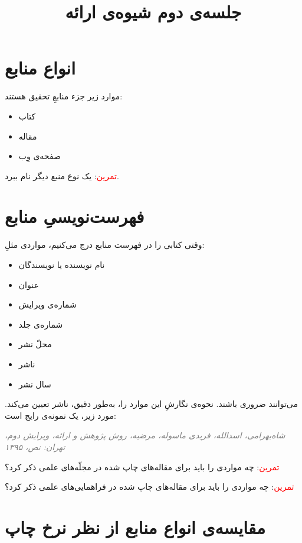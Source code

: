 \documentclass{article}
\begin{document}
\title{جلسه‌ی دوم شیوه‌ی ارائه}
\date{}
\maketitle
\section{انواع منابع}
موارد زیر جزء منابعِ تحقیق هستند:
\begin{itemize}
\item کتاب
\item مقاله
\item صفحه‌ی وِب
\end{itemize}
\textcolor{red}{تمرین}: یک نوع منبع دیگر نام ببرد.
\section{فهرست‌نویسیِ منابع} \label{sec:refs}
وقتی کتابی را در فهرست منابع درج می‌کنیم، مواردی مثلِ:
\begin{itemize}
\item نام نویسنده یا نویسندگان
\item عنوان
\item شماره‌ی ویرایش
\item شماره‌ی جلد
\item محلّ نشر
\item ناشر
\item سال نشر
\end{itemize}
می‌توانند ضروری باشند. نحوه‌ی نگارشِ این موارد را، به‌طور دقیق، ناشر تعیین می‌کند. مورد زیر، یک نمونه‌ی رایج است:
\begin{center}
\textcolor{gray}{\emph{شاه‌بهرامی، اسدالله، فریدی ماسوله، مرضیه، روش پژوهش و ارائه، ویرایش دوم، تهران: نص، ۱۳۹۵}}
\end{center}
\textcolor{red}{تمرین}: چه مواردی را باید برای مقاله‌های چاپ شده در مجلّه‌های علمی  ذکر کرد؟

\noindent \textcolor{red}{تمرین}: چه مواردی را باید برای مقاله‌های چاپ شده در فراهمایی‌های علمی ذکر کرد؟
\section{مقایسه‌ی انواع منابع از نظر نرخ چاپ}
\vskip 1cm
\end{document}
